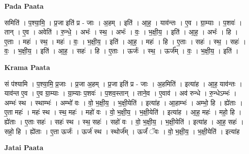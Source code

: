 \documentclass[17pt]{extarticle}
\begin{document}
\textbf{Pada Paata} \newline

समिति॑ । प॒श्या॒मि॒ । प्र॒जा इति॑ प्र - जाः । अ॒हम् । इति॑ । आ॒ह॒ । याव॑न्तः । ए॒व । ग्रा॒म्याः । प॒शवः॑ । तान् । ए॒व । अवेति॑ । रु॒न्धे॒ । अभंः॑ । स्थ॒ । अभंः॑ । वः॒ । भ॒क्षी॒य॒ । इति॑ । आ॒ह॒ । अभंः॑ । हि । ए॒ताः । महः॑ । स्थ॒ । महः॑ । वः॒ । भ॒क्षी॒य॒ । इति॑ । आ॒ह॒ । महः॑ । हि । ए॒ताः । सहः॑ । स्थ॒ । सहः॑ । वः॒ । भ॒क्षी॒य॒ । इति॑ । आ॒ह॒ । सहः॑ । हि । ए॒ताः । ऊर्जः॑ । स्थ॒ । ऊर्ज᳚म् । वः॒ । भ॒क्षी॒य॒ । इति॑ ।  \newline


\textbf{Krama Paata} \newline

सं प॑श्यामि । प॒श्या॒मि॒ प्र॒जाः । प्र॒जा अ॒हम् । प्र॒जा इति॑ प्र - जाः । अ॒हमिति॑ । इत्या॑ह । आ॒ह॒ याव॑न्तः । याव॑न्त ए॒व । ए॒व ग्रा॒म्याः । ग्रा॒म्याः प॒शवः॑ । प॒शव॒स्तान् । ताने॒व । ए॒वाव॑ । अव॑ रुन्धे । रु॒न्धेऽम्भः॑ । अम्भः॑ स्थ । स्थाम्भः॑ । अम्भो॑ वः । वो॒ भ॒क्षी॒य॒ । भ॒क्षी॒येति॑ । इत्या॑ह । आ॒हाम्भः॑ । अम्भो॒ हि । ह्ये॑ताः । ए॒ता महः॑ । महः॑ स्थ । स्थ॒ महः॑ । महो॑ वः । वो॒ भ॒क्षी॒य॒ । भ॒क्षी॒येति॑ । इत्या॑ह । आ॒ह॒ महः॑ । महो॒ हि । ह्ये॑ताः । ए॒ताः सहः॑ । सहः॑ स्थ । स्थ॒ सहः॑ । सहो॑ वः । वो॒ भ॒क्षी॒य॒ । भ॒क्षी॒येति॑ । इत्या॑ह । आ॒ह॒ सहः॑ । सहो॒ हि । ह्ये॑ताः । ए॒ता ऊर्जः॑ । ऊर्ज॑ स्थ । स्थोर्ज᳚म् । ऊर्जं॑ ॅवः । वो॒ भ॒क्षी॒य॒ । भ॒क्षी॒येति॑ । इत्या॑ह \newline

\textbf{Jatai Paata} \newline
\end{document}
